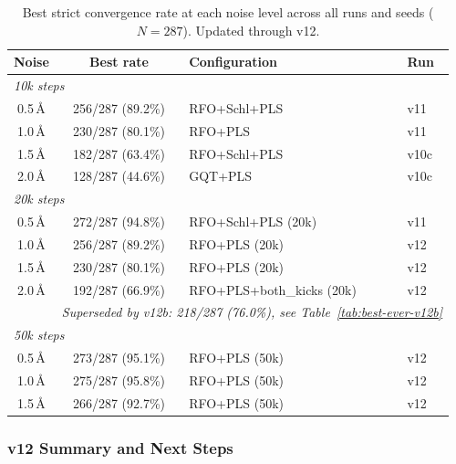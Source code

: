 \documentclass[11pt,a4paper]{article}
\theoremstyle{definition}
\begin{document}
\begin{table}[h]
\centering
\caption{Best strict convergence rate at each noise level across all runs
  and seeds ($N=287$).  Updated through v12.}
\label{tab:best-ever-v12}
\begin{tabular}{ccll}
\toprule
Noise & Best rate & Configuration & Run \\
\midrule
\multicolumn{4}{l}{\emph{10k steps}} \\
0.5\,\AA & 256/287 (89.2\%) & RFO+Schl+PLS       & v11 \\
1.0\,\AA & 230/287 (80.1\%) & RFO+PLS             & v11 \\
1.5\,\AA & 182/287 (63.4\%) & RFO+Schl+PLS        & v10c \\
2.0\,\AA & 128/287 (44.6\%) & GQT+PLS             & v10c \\
\midrule
\multicolumn{4}{l}{\emph{20k steps}} \\
0.5\,\AA & 272/287 (94.8\%) & RFO+Schl+PLS (20k)  & v11 \\
1.0\,\AA & 256/287 (89.2\%) & RFO+PLS (20k)        & v12 \\
1.5\,\AA & 230/287 (80.1\%) & RFO+PLS (20k)        & v12 \\
2.0\,\AA & 192/287 (66.9\%) & RFO+PLS+both\_kicks (20k) & v12 \\
       & \multicolumn{3}{l}{\emph{Superseded by v12b: 218/287 (76.0\%), see Table~\ref{tab:best-ever-v12b}}} \\
\midrule
\multicolumn{4}{l}{\emph{50k steps}} \\
0.5\,\AA & 273/287 (95.1\%) & RFO+PLS (50k)  & v12 \\
1.0\,\AA & 275/287 (95.8\%) & RFO+PLS (50k)  & v12 \\
1.5\,\AA & 266/287 (92.7\%) & RFO+PLS (50k)  & v12 \\
\bottomrule
\end{tabular}
\end{table}

\subsubsection{v12 Summary and Next Steps}
\label{sec:v12-summary}
\end{document}
